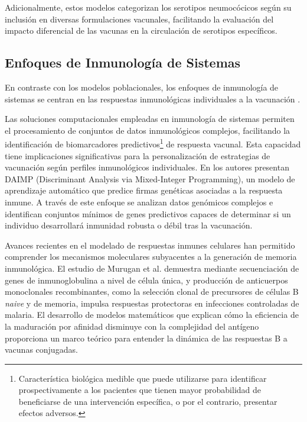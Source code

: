 Adicionalmente, estos modelos categorizan los serotipos neumocócicos según su inclusión en diversas formulaciones vacunales, facilitando la evaluación del impacto diferencial de las vacunas en la circulación de serotipos específicos. 

\subsection{Enfoques de Inmunología de Sistemas}

En contraste con los modelos poblacionales, los enfoques de inmunología de sistemas se centran en las respuestas inmunológicas individuales a la vacunación \cite{Obermoser2013}. 


Las soluciones computacionales empleadas en inmunología de sistemas permiten el procesamiento de conjuntos de datos inmunológicos complejos, facilitando la identificación de biomarcadores predictivos\footnote{Característica biológica medible que puede utilizarse para identificar prospectivamente a los pacientes que tienen mayor probabilidad de beneficiarse de una intervención específica, o por el contrario, presentar efectos adversos.} de respuesta vacunal. Esta capacidad tiene implicaciones significativas para la personalización de estrategias de vacunación según perfiles inmunológicos individuales.
En \cite{Lee2016} los autores presentan DAIMP (Discriminant Analysis via Mixed-Integer Programming), un modelo de aprendizaje automático que predice firmas genéticas asociadas a la respuesta inmune. A través de este enfoque se analizan datos genómicos complejos e identifican conjuntos mínimos de genes predictivos capaces de determinar si un individuo desarrollará inmunidad robusta o débil tras la vacunación. 


Avances recientes en el modelado de respuestas inmunes celulares han permitido comprender los mecanismos moleculares subyacentes a la generación de memoria inmunológica. El estudio de Murugan et al. \cite{Murugan2018} demuestra mediante secuenciación de genes de inmunoglobulina a nivel de célula única, y producción de anticuerpos monoclonales recombinantes, como la selección clonal de precursores de células B \textit{naive} y de memoria, impulsa respuestas protectoras en infecciones controladas de malaria. 
El desarrollo de modelos matemáticos que explican cómo la eficiencia de la maduración por afinidad disminuye con la complejidad del antígeno proporciona un marco teórico para entender la dinámica de las respuestas B a vacunas conjugadas.


